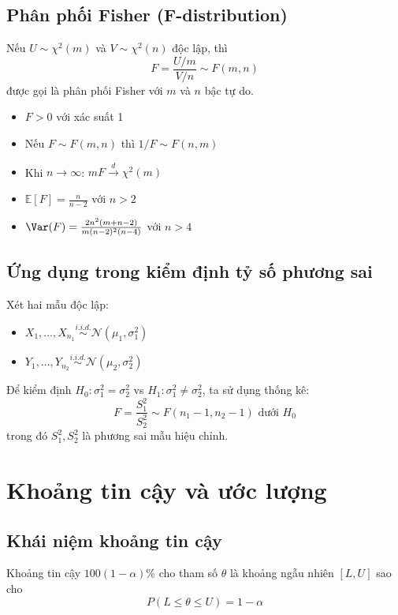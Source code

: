 \subsection{Phân phối Fisher (F-distribution)}
\begin{dn}
Nếu $U \sim \chi^2(m)$ và $V \sim \chi^2(n)$ độc lập, thì 
\[
F = \frac{U/m}{V/n} \sim F(m,n)
\]
được gọi là phân phối Fisher với $m$ và $n$ bậc tự do.
\end{dn}

\begin{tinhchat}
\begin{itemize}
    \item $F > 0$ với xác suất 1
    \item Nếu $F \sim F(m,n)$ thì $1/F \sim F(n,m)$
    \item Khi $n \to \infty$: $mF \xrightarrow{d} \chi^2(m)$
    \item $\mathbb{E}[F] = \frac{n}{n-2}$ với $n > 2$
    \item $\Var(F) = \frac{2n^2(m+n-2)}{m(n-2)^2(n-4)}$ với $n > 4$
\end{itemize}
\end{tinhchat}

\subsection{Ứng dụng trong kiểm định tỷ số phương sai}
Xét hai mẫu độc lập:
\begin{itemize}
    \item $X_1, \ldots, X_{n_1} \overset{i.i.d.}{\sim} \mathcal{N}(\mu_1, \sigma_1^2)$
    \item $Y_1, \ldots, Y_{n_2} \overset{i.i.d.}{\sim} \mathcal{N}(\mu_2, \sigma_2^2)$
\end{itemize}

Để kiểm định $H_0: \sigma_1^2 = \sigma_2^2$ vs $H_1: \sigma_1^2 \neq \sigma_2^2$, ta sử dụng thống kê:
\[
F = \frac{S_1^2}{S_2^2} \sim F(n_1-1, n_2-1) \text{ dưới } H_0
\]
trong đó $S_1^2, S_2^2$ là phương sai mẫu hiệu chỉnh.

\section{Khoảng tin cậy và ước lượng}

\subsection{Khái niệm khoảng tin cậy}
\begin{dn}
Khoảng tin cậy $100(1-\alpha)\%$ cho tham số $\theta$ là khoảng ngẫu nhiên $[L, U]$ sao cho
\[
P(L \leq \theta \leq U) = 1-\alpha
\]
\end{dn}


